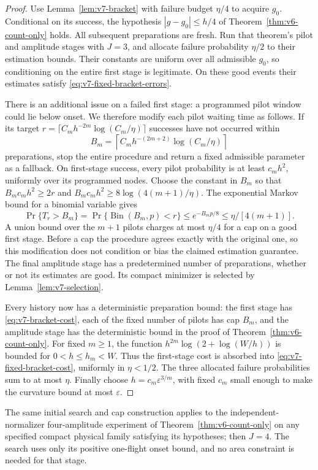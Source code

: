 \begin{proof}
Use Lemma~\ref{lem:v7-bracket} with failure budget $\eta/4$ to acquire
$g_0$. Conditional on its success, the hypothesis
$|g-g_0|\le h/4$ of Theorem~\ref{thm:v6-count-only} holds.
All subsequent preparations are fresh. Run that theorem's pilot and
amplitude stages with $J=3$, and allocate failure probability
$\eta/2$ to their estimation bounds. Their constants are uniform over
all admissible $g_0$, so conditioning on the entire first stage is
legitimate. On these good events their estimates satisfy
\eqref{eq:v7-fixed-bracket-errors}.

There is an additional issue on a failed first stage: a programmed
pilot window could lie below onset. We therefore modify each pilot
waiting time as follows. If its target
$r=\lceil C_mh^{-2m}\log(C_m/\eta)\rceil$ successes have not occurred
within
\[
 B_m=\left\lceil C_m h^{-(2m+2)}\log(C_m/\eta)\right\rceil
\]
preparations, stop the entire procedure and return a fixed admissible
parameter as a fallback. On first-stage success, every pilot
probability is at least $c_mh^2$, uniformly over its programmed nodes.
Choose the constant in $B_m$ so that $B_mc_mh^2\ge2r$ and
$B_mc_mh^2\ge8\log(4(m+1)/\eta)$. The exponential Markov bound for a
binomial variable gives
\[
 \Pr\{T_r>B_m\}
  =\Pr\{\operatorname{Bin}(B_m,p)<r\}
  \le e^{-B_mp/8}\le\eta/[4(m+1)].
\]
A union bound over the $m+1$ pilots charges at most $\eta/4$ for a
cap on a good first stage. Before a cap the procedure agrees exactly
with the original one, so this modification does not condition or
bias the claimed estimation guarantee. The final amplitude stage has
a predetermined number of preparations, whether or not its estimates
are good. Its compact minimizer is selected by
Lemma~\ref{lem:v7-selection}.

Every history now has a deterministic preparation bound: the first
stage has \eqref{eq:v7-bracket-cost}, each of the fixed number of
pilots has cap $B_m$, and the amplitude stage has the deterministic
bound in the proof of Theorem~\ref{thm:v6-count-only}. For fixed
$m\ge1$, the function
$h^{2m}\log(2+\log(W/h))$ is bounded for $0<h\le h_m<W$.
Thus the first-stage cost is absorbed into
\eqref{eq:v7-fixed-bracket-cost}, uniformly in $\eta<1/2$.
The three allocated failure probabilities sum to at most $\eta$.
Finally choose $h=c_m\varepsilon^{3/m}$, with fixed $c_m$ small enough
to make the curvature bound at most $\varepsilon$.
\end{proof}

The same initial search and cap construction applies to the independent-
normalizer four-amplitude experiment of Theorem~\ref{thm:v6-count-only}
on any specified compact physical family satisfying its hypotheses;
then $J=4$. The search uses only its positive one-flight onset bound,
and no area constraint is needed for that stage.


